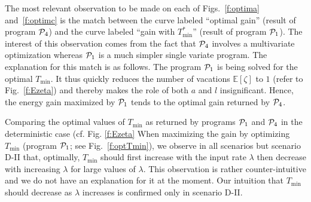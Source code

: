 \documentclass[journal]{IEEEtran}
\def \E{{\mathbb E}}
\begin{document}
The most relevant observation to be made on each of Figs.~\ref{f:optima} and~\ref{f:optimc} is the match between the curve labeled ``optimal gain'' (result of program ${\cal P}_4$) and the curve labeled ``gain with $T_{\min}^*$'' (result of program ${\cal P}_1$). The interest of this observation comes from the fact that ${\cal P}_4$ involves a multivariate optimization whereas ${\cal P}_1$ is a much simpler single variate program.
The explanation for this match is as follows. The program ${\cal P}_1$ is being solved for the optimal $T_{\min}$. It thus quickly reduces the number of vacations $\E[\zeta]$ to $1$ (refer to Fig.~\ref{f:Ezeta}) and thereby makes the role of both $a$ and $l$ insignificant. Hence, the energy gain maximized by ${\cal P}_1$ tends to the optimal gain returned by ${\cal P}_4$.


Comparing the optimal values of $T_{\min}$ as returned by programs ${\cal P}_1$ and ${\cal P}_4$ in the deterministic case (cf. Fig. \ref{f:Ezeta} When maximizing the gain by optimizing $T_{\min}$ (program ${\cal P}_1$; see Fig.~\ref{f:optTmin}), we observe in all scenarios but scenario D-II that, optimally, $T_{\min}$ should first increase with the input rate $\lambda$ then decrease with increasing $\lambda$ for large values of $\lambda$. This observation is rather counter-intuitive and we do not have an explanation for it at the moment. Our intuition that $T_{\min}$ should decrease as $\lambda$ increases is confirmed only in scenario D-II.
\end{document}
